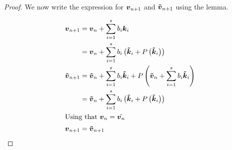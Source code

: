 \begin{proof}
We now write the expression for ${\boldsymbol {v}}_{n+1}$ and ${\boldsymbol {\tilde{v}}}_{n+1}$ using the lemma.

\begin{align*}
{\boldsymbol {v}}_{n+1}&={\boldsymbol {v}}_{n}+\sum_{i=1}^{s}b_{i}{\boldsymbol {k}}_{i}\\
&={\boldsymbol {v}}_{n}+\sum_{i=1}^{s}b_{i}\left({\boldsymbol {\tilde{k}}}_{i}+P\left({\boldsymbol {\tilde{k}}}_{i}\right)\right)\\
{\boldsymbol {\tilde{v}}}_{n+1}&={\boldsymbol {\tilde{v}}}_{n}+\sum_{i=1}^{s}b_{i}{\boldsymbol {\tilde{k}}}_{i}+P\left({\boldsymbol {\tilde{v}}}_{n}+\sum_{i=1}^{s}b_{i}{\boldsymbol {\tilde{k}}}_{i}\right)\\
&={\boldsymbol {\tilde{v}}}_{n}+\sum_{i=1}^{s}b_{i}\left({\boldsymbol {\tilde{k}}}_{i}+P\left({\boldsymbol {\tilde{k}}}_{i}\right)\right)\\
\intertext{Using that ${\boldsymbol {v}}_{n}=\tilde{{\boldsymbol {v}}_{n}}$}
{\boldsymbol {v}}_{n+1}&={\boldsymbol {\tilde{v}}}_{n+1}
\end{align*}

\end{proof}

